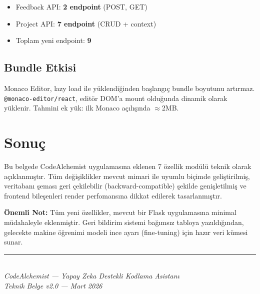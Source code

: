 \documentclass[12pt,a4paper]{article}
\begin{document}
\begin{itemize}
  \item Feedback API: \textbf{2 endpoint} (POST, GET)
  \item Project API:  \textbf{7 endpoint} (CRUD + context)
  \item Toplam yeni endpoint: \textbf{9}
\end{itemize}

\subsection{Bundle Etkisi}

Monaco Editor, lazy load ile yüklendiğinden başlangıç bundle boyutunu artırmaz. \texttt{@monaco-editor/react}, editör DOM'a mount olduğunda dinamik olarak yüklenir. Tahmini ek yük: ilk Monaco açılışında $\approx$2MB.

\section{Sonuç}

Bu belgede CodeAlchemist uygulamasına eklenen 7 özellik modülü teknik olarak açıklanmıştır. Tüm değişiklikler mevcut mimari ile uyumlu biçimde geliştirilmiş, veritabanı şeması geri çekilebilir (backward-compatible) şekilde genişletilmiş ve frontend bileşenleri render perfomansına dikkat edilerek tasarlanmıştır.

\begin{mdframed}[backgroundcolor=lightgray]
\textbf{Önemli Not:} Tüm yeni özellikler, mevcut bir Flask uygulamasına minimal müdahaleyle eklenmiştir. Geri bildirim sistemi bağımsız tabloya yazıldığından, gelecekte makine öğrenimi modeli ince ayarı (fine-tuning) için hazır veri kümesi sunar.
\end{mdframed}

\vspace{1cm}
\begin{center}
\textcolor{fuchsia}{\rule{10cm}{0.5pt}}\\[0.3em]
\textit{CodeAlchemist — Yapay Zeka Destekli Kodlama Asistanı}\\
\textit{Teknik Belge v2.0 — Mart 2026}
\end{center}
\end{document}
